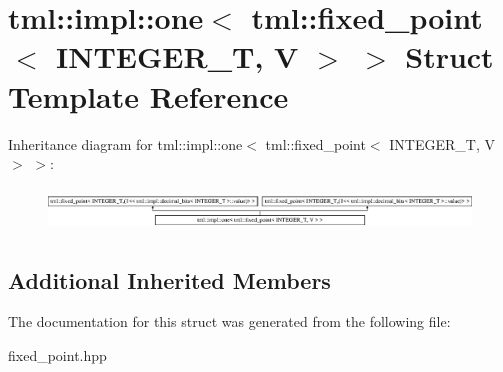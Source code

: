 \hypertarget{structtml_1_1impl_1_1one_3_01tml_1_1fixed__point_3_01INTEGER__T_00_01V_01_4_01_4}{\section{tml\+:\+:impl\+:\+:one$<$ tml\+:\+:fixed\+\_\+point$<$ I\+N\+T\+E\+G\+E\+R\+\_\+\+T, V $>$ $>$ Struct Template Reference}
\label{structtml_1_1impl_1_1one_3_01tml_1_1fixed__point_3_01INTEGER__T_00_01V_01_4_01_4}
}
Inheritance diagram for tml\+:\+:impl\+:\+:one$<$ tml\+:\+:fixed\+\_\+point$<$ I\+N\+T\+E\+G\+E\+R\+\_\+\+T, V $>$ $>$\+:\begin{figure}[H]
\begin{center}
\leavevmode
\includegraphics[height=1.161826cm]{structtml_1_1impl_1_1one_3_01tml_1_1fixed__point_3_01INTEGER__T_00_01V_01_4_01_4}
\end{center}
\end{figure}
\subsection*{Additional Inherited Members}


The documentation for this struct was generated from the following file\+:\begin{DoxyCompactItemize}
\item 
fixed\+\_\+point.\+hpp\end{DoxyCompactItemize}
